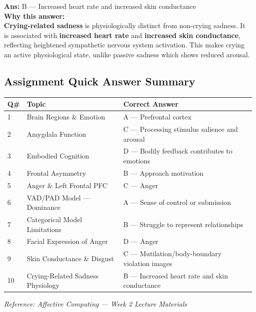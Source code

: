 \documentclass[11pt,a4paper]{article}
\newcommand{\bb}[1]{\textbf{#1}}
\begin{document}
\vspace{0.3cm}
\noindent\textbf{Ans:} B --- Increased heart rate and increased skin conductance\\[0.2cm]
\textbf{Why this answer:} \\
\textbf{Crying-related sadness} is physiologically distinct from non-crying sadness. It is associated with \textbf{increased heart rate} and \textbf{increased skin conductance}, reflecting heightened sympathetic nervous system activation. This makes crying an active physiological state, unlike passive sadness which shows reduced arousal.
\vspace{0.4cm}

\medskip
\subsection*{Assignment Quick Answer Summary}

\begin{center}
\renewcommand{\arraystretch}{1.4}
\begin{tabular}{|L{0.8cm}|L{6.2cm}|L{8.2cm}|}
\hline
\bb{Q\#} & \bb{Topic} & \bb{Correct Answer} \\
 & Brain Regions \& Emotion & A --- Prefrontal cortex \\
2 & Amygdala Function & C --- Processing stimulus salience and arousal \\
3 & Embodied Cognition & D --- Bodily feedback contributes to emotions \\
4 & Frontal Asymmetry & B --- Approach motivation \\
5 & Anger \& Left Frontal PFC & C --- Anger \\
6 & VAD/PAD Model --- Dominance & A --- Sense of control or submission \\
7 & Categorical Model Limitations & B --- Struggle to represent relationships \\
8 & Facial Expression of Anger & D --- Anger \\
9 & Skin Conductance \& Disgust & C --- Mutilation/body-boundary violation images \\
10 & Crying-Related Sadness Physiology & B --- Increased heart rate and skin conductance \\
\hline
\end{tabular}
\end{center}

\medskip
{\small\textit{Reference: Affective Computing --- Week 2 Lecture Materials}}
\end{document}
